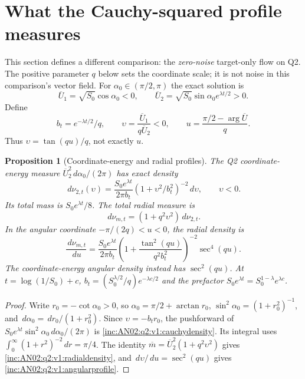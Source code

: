 \documentclass[11pt]{article}
\numberwithin{equation}{section}
\newtheorem{proposition}[theorem]{Proposition}\newtheorem{corollary}[theorem]{Corollary}
\theoremstyle{remark}\newtheorem{remark}[theorem]{Remark}
\newcommand{\dd}{\,d}\newcommand{\E}{\mathbb E}\newcommand{\R}{\mathbb R}
\begin{document}
\section{What the Cauchy-squared profile measures}
\label{inc:AN02:q2:v1:profile}
This section defines a different comparison: the \emph{zero-noise}
target-only flow on Q2. The positive parameter $q$ below sets the
coordinate scale; it is not noise in this comparison's vector field.
For $\alpha_0\in(\pi/2,\pi)$ the exact solution is
\[
 \overline U_1=\sqrt{S_0}\cos\alpha_0<0,\qquad
 \overline U_2=\sqrt{S_0}\sin\alpha_0e^{\lambda t/2}>0.
\]
Define
\[
 b_t=e^{-\lambda t/2}/q,\qquad
 \upsilon=\frac{\overline U_1}{q\overline U_2}<0,
 \qquad u=\frac{\pi/2-\arg\overline U}{q}.
\]
Thus $\upsilon=\tan(qu)/q$, not exactly $u$.

\begin{proposition}[Coordinate-energy and radial profiles]
\label{inc:AN02:q2:v1:cauchy}
The Q2 coordinate-energy measure
$\overline U_2^2\dd\alpha_0/(2\pi)$ has exact density
\begin{equation}\label{inc:AN02:q2:v1:cauchydensity}
 \dd\nu_{2,t}(\upsilon)
 =\frac{S_0e^{\lambda t}}{2\pi b_t}
      (1+\upsilon^2/b_t^2)^{-2}\dd\upsilon,
      \qquad \upsilon<0.
\end{equation}
Its total mass is $S_0e^{\lambda t}/8$. The total radial measure is
\begin{equation}\label{inc:AN02:q2:v1:radialdensity}
 \dd\nu_{m,t}=(1+q^2\upsilon^2)\dd\nu_{2,t}.
\end{equation}
In the angular coordinate $-\pi/(2q)<u<0$, the radial density is
\begin{equation}\label{inc:AN02:q2:v1:angularprofile}
 \frac{\dd\nu_{m,t}}{\dd u}
 =\frac{S_0e^{\lambda t}}{2\pi b_t}
 \left(1+\frac{\tan^2(qu)}{q^2b_t^2}\right)^{-2}\sec^4(qu).
\end{equation}
The coordinate-energy angular density instead has $\sec^2(qu)$.
At $t=\log(1/S_0)+c$, $b_t=(S_0^{\lambda/2}/q)e^{-\lambda c/2}$
and the prefactor $S_0e^{\lambda t}=S_0^{1-\lambda}e^{\lambda c}$.
\end{proposition}
\begin{proof}
Write $r_0=-\cot\alpha_0>0$, so
$\alpha_0=\pi/2+\arctan r_0$, $\sin^2\alpha_0=(1+r_0^2)^{-1}$,
and $\dd\alpha_0=\dd r_0/(1+r_0^2)$. Since
$\upsilon=-b_t r_0$, the pushforward of
$S_0e^{\lambda t}\sin^2\alpha_0\dd\alpha_0/(2\pi)$ is
\eqref{inc:AN02:q2:v1:cauchydensity}. Its integral uses
$\int_0^\infty(1+r^2)^{-2}\dd r=\pi/4$.
The identity $\overline m=\overline U_2^2(1+q^2\upsilon^2)$
gives \eqref{inc:AN02:q2:v1:radialdensity}, and
$\dd\upsilon/\dd u=\sec^2(qu)$ gives
\eqref{inc:AN02:q2:v1:angularprofile}.
\end{proof}
\end{document}
